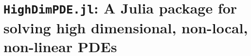 %
\chapter{\texttt{HighDimPDE.jl}: A Julia package for solving high dimensional, non-local, non-linear PDEs}
\label{sec:related}


